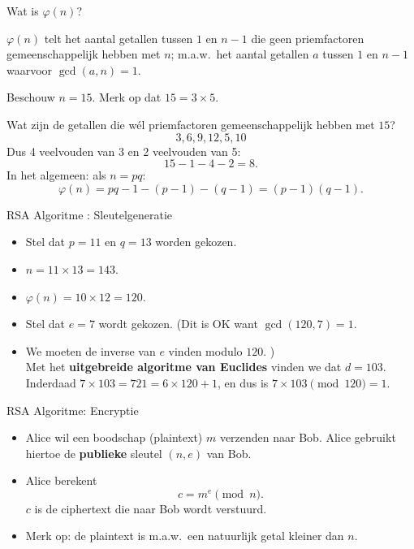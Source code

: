 \documentclass{beamer}
\begin{document}
\begin{frame}{Wat is $\varphi(n)$?}

$\varphi(n)$ telt het aantal getallen tussen $1$ en $n-1$ die geen priemfactoren gemeenschappelijk
hebben met $n$; m.a.w.\ het aantal getallen $a$ tussen $1$ en $n-1$ waarvoor $\gcd(a, n) = 1$.

\vspace{0.5cm}
Beschouw $ n = 15$. Merk op dat $ 15 = 3 \times 5$.

Wat zijn de getallen die w\'el priemfactoren gemeenschappelijk hebben met $15$?
\[
3, 6 , 9, 12, 5, 10
\]
Dus 4 veelvouden van 3 en 2 veelvouden van 5: 
\[
15 - 1 - 4 - 2 = 8.
\]
In het algemeen: als $n = p q$:
\[
\varphi(n) = pq - 1 - (p-1) - (q-1) = (p-1)(q-1).
\]


\end{frame}


%		

\begin{frame}{RSA Algoritme : Sleutelgeneratie}

\begin{itemize}
	\item Stel dat $p = 11$ en $q = 13$ worden gekozen.
	\item $ n = 11 \times 13 = 143$.
	\item $\varphi(n) = 10 \times 12 = 120$.
	\item Stel dat $e = 7$ wordt gekozen. (Dit is OK want $\gcd(120, 7) = 1$.
	\item We moeten de inverse van $e$ vinden modulo $120$. )\\
	 Met het \textbf{uitgebreide algoritme van Euclides} vinden we dat $d = 103$.\\
	 Inderdaad $ 7 \times 103 = 721 = 6 \times 120 + 1$, en dus is 
	 $7 \times 103 \pmod{120} = 1$.
	  
\end{itemize}
\end{frame}

\begin{frame}{RSA Algoritme: Encryptie}
\begin{itemize}
	\item Alice wil een boodschap (plaintext) $m$ verzenden naar Bob. Alice gebruikt hiertoe de \textbf{publieke} sleutel $(n, e)$ van Bob.
	\item Alice berekent
	\[
	 c = m^e \pmod{n}.
	\]
	$c$ is de ciphertext die naar Bob wordt verstuurd.
	\item Merk op: de plaintext is m.a.w.\ een natuurlijk getal
	kleiner dan $n$.
\end{itemize}
\end{frame}
\end{document}
